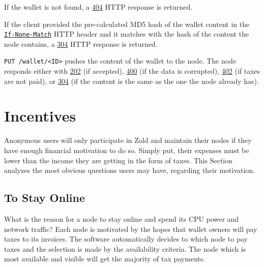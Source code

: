 \documentclass[11pt,oneside]{article}
\newcommand\dd[1]{\colorbox{gray!30}{\texttt{#1}}}
\begin{document}
If the wallet is not found, a
\href{https://www.w3.org/Protocols/rfc2616/rfc2616-sec10.html#sec10.4.5}{404}
HTTP response is returned.

If the client provided the pre-calculated MD5 hash of the wallet content in the
\href{https://www.w3.org/Protocols/rfc2616/rfc2616-sec14.html#sec14.26}{\dd{If-None-Match}}
HTTP header and it matches with the hash of the
content the node contains, a
\href{https://www.w3.org/Protocols/rfc2616/rfc2616-sec10.html#sec10.3.5}{304} HTTP response is returned.

\dd{PUT /wallet/<ID>} pushes the content of the wallet to the node. The
node responds either with
\href{https://www.w3.org/Protocols/rfc2616/rfc2616-sec10.html#sec10.2.3}{202} (if accepted),
\href{https://www.w3.org/Protocols/rfc2616/rfc2616-sec10.html#sec10.4.1}{400} (if the data is corrupted),
\href{https://www.w3.org/Protocols/rfc2616/rfc2616-sec10.html#sec10.4.3}{402} (if taxes are not paid),
or
\href{https://www.w3.org/Protocols/rfc2616/rfc2616-sec10.html#sec10.3.5}{304}
(if the content is the same as the one the node already has).

\section{Incentives}\label{sec:incentives}

Anonymous users will only participate in Zold and maintain
their nodes if they have enough financial motivation to do so. Simply
put, their expenses must be lower than the income they are getting in
the form of taxes. This Section analyzes the most obvious questions users
may have, regarding their motivation.

\subsection{To Stay Online}

What is the reason for a node to stay online and spend its CPU power
and network traffic? Each node is motivated by the
hopes that wallet owners will pay taxes to its invoices. The software
automatically decides to which node to pay taxes and the selection is
made by the availability criteria. The node which is most available
and visible will get the majority of tax payments.
\end{document}

